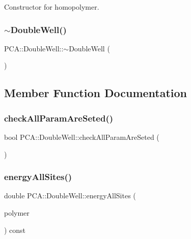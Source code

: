 Constructor for homopolymer. 

\hypertarget{class_p_c_a_1_1_double_well_a0cac56024b17d2aa95468c9c3145eca9}{}\label{class_p_c_a_1_1_double_well_a0cac56024b17d2aa95468c9c3145eca9} 
\subsubsection{\texorpdfstring{$\sim$\+Double\+Well()}{~DoubleWell()}}
{\footnotesize\ttfamily P\+C\+A\+::\+Double\+Well\+::$\sim$\+Double\+Well (\begin{DoxyParamCaption}{ }\end{DoxyParamCaption})}



\subsection{Member Function Documentation}
\hypertarget{class_p_c_a_1_1_double_well_ac77ffe1350084b4037d9a36abfb6cf9b}{}\label{class_p_c_a_1_1_double_well_ac77ffe1350084b4037d9a36abfb6cf9b} 
\subsubsection{\texorpdfstring{check\+All\+Param\+Are\+Seted()}{checkAllParamAreSeted()}}
{\footnotesize\ttfamily bool P\+C\+A\+::\+Double\+Well\+::check\+All\+Param\+Are\+Seted (\begin{DoxyParamCaption}{ }\end{DoxyParamCaption})}

\hypertarget{class_p_c_a_1_1_double_well_a35be7be79cb922e39b0239d92f6abac1}{}\label{class_p_c_a_1_1_double_well_a35be7be79cb922e39b0239d92f6abac1} 
\subsubsection{\texorpdfstring{energy\+All\+Sites()}{energyAllSites()}}
{\footnotesize\ttfamily double P\+C\+A\+::\+Double\+Well\+::energy\+All\+Sites (\begin{DoxyParamCaption}\item[{const \hyperlink{class_p_c_a_1_1_polymer_m_c}{Polymer\+MC} \&}]{polymer }\end{DoxyParamCaption}) const}

